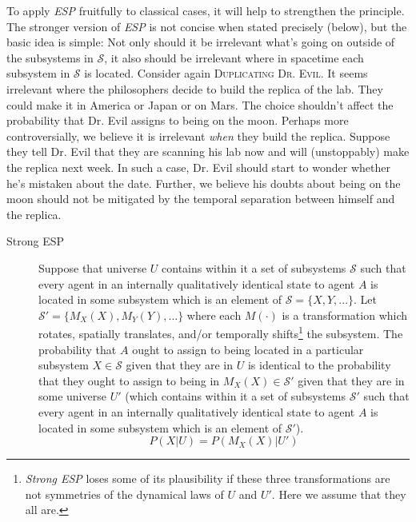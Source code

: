 \documentclass[onecolumn,secnumarabic,amsmath,amssymb,balancelastpage,nofootinbib]{article}
\begin{document}
To apply \emph{ESP} fruitfully to classical cases, it will help to strengthen the principle.  The stronger version of \emph{ESP} is not concise when stated precisely (below), but the basic idea is simple:  Not only should it be irrelevant what's going on outside of the subsystems in $\mathcal{S}$, it also should be irrelevant where in spacetime each subsystem in $\mathcal{S}$ is located.  Consider again \textsc{Duplicating Dr. Evil}.  It seems irrelevant where the philosophers decide to build the replica of the lab.  They could make it in America or Japan or on Mars.  The choice shouldn't affect the probability that Dr. Evil assigns to being on the moon.  Perhaps more controversially, we believe it is irrelevant \emph{when} they build the replica.  Suppose they tell Dr. Evil that they are scanning his lab now and will (unstoppably) make the replica next week.  In such a case, Dr. Evil should start to wonder whether he's mistaken about the date.  Further, we believe his doubts about being on the moon should not be mitigated by the temporal separation between himself and the replica.
\begin{description}
\item[Strong ESP]  
Suppose that universe $U$ contains within it a set of subsystems $\mathcal{S}$ such that every agent in an internally qualitatively identical state to agent $A$ is located in some subsystem which is an element of $\mathcal{S}=\{X,Y,...\}$.  Let $\mathcal{S}'=\{M_X(X),M_Y(Y),...\}$ where each $M(\cdot)$ is a transformation which rotates, spatially translates, and/or temporally shifts\footnote{\emph{Strong ESP} loses some of its plausibility if these three transformations are not symmetries of the dynamical laws of $U$ and $U'$.  Here we assume that they all are.} the subsystem.  The probability that $A$ ought to assign to being located in a particular subsystem $X\in\mathcal{S}$ given that they are in $U$ is identical to the probability that they ought to assign to being in $M_X(X)\in\mathcal{S}'$ given that they are in some universe $U'$ (which contains within it a set of subsystems $\mathcal{S}'$ such that every agent in an internally qualitatively identical state to agent $A$ is located in some subsystem which is an element of $\mathcal{S}'$).
\begin{equation}
P(X|U)=P(M_X(X)|U')
\label{sesp}
\end{equation}
\end{description}
\end{document}
